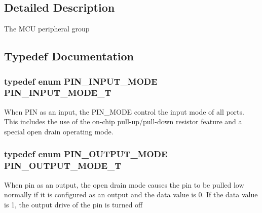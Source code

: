 \subsection{Detailed Description}
The M\-C\-U peripheral group 

\subsection{Typedef Documentation}
\hypertarget{group___peripheral_gad5705547b72a4480dc714447b3bbfb64}{
\subsubsection[{P\-I\-N\-\_\-\-I\-N\-P\-U\-T\-\_\-\-M\-O\-D\-E\-\_\-\-T}]{\setlength{\rightskip}{0pt plus 5cm}typedef enum {\bf P\-I\-N\-\_\-\-I\-N\-P\-U\-T\-\_\-\-M\-O\-D\-E} {\bf P\-I\-N\-\_\-\-I\-N\-P\-U\-T\-\_\-\-M\-O\-D\-E\-\_\-\-T}}}\label{group___peripheral_gad5705547b72a4480dc714447b3bbfb64}
When P\-I\-N as an input, the P\-I\-N\-\_\-\-M\-O\-D\-E control the input mode of all ports. This includes the use of the on-\/chip pull-\/up/pull-\/down resistor feature and a special open drain operating mode. \hypertarget{group___peripheral_ga29412fef1d1b9fafc0cd270a5d702f28}{
\subsubsection[{P\-I\-N\-\_\-\-O\-U\-T\-P\-U\-T\-\_\-\-M\-O\-D\-E\-\_\-\-T}]{\setlength{\rightskip}{0pt plus 5cm}typedef enum {\bf P\-I\-N\-\_\-\-O\-U\-T\-P\-U\-T\-\_\-\-M\-O\-D\-E} {\bf P\-I\-N\-\_\-\-O\-U\-T\-P\-U\-T\-\_\-\-M\-O\-D\-E\-\_\-\-T}}}\label{group___peripheral_ga29412fef1d1b9fafc0cd270a5d702f28}
When pin as an output, the open drain mode causes the pin to be pulled low normally if it is configured as an output and the data value is 0. If the data value is 1, the output drive of the pin is turned off 

